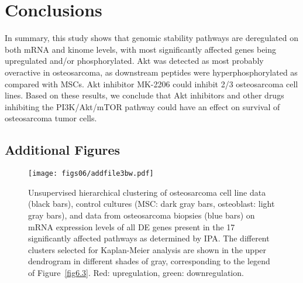 \section{Conclusions}\label{conclusions6}
In summary, this study shows that genomic stability pathways are deregulated on both mRNA and kinome levels, with most significantly affected genes being upregulated and/or phosphorylated. Akt was detected as most probably overactive in osteosarcoma, as downstream peptides were hyperphosphorylated as compared with MSCs. Akt inhibitor MK-2206 could inhibit 2/3 osteosarcoma cell lines. Based on these results, we conclude that Akt inhibitors and other drugs inhibiting the PI3K/Akt/mTOR pathway could have an effect on survival of osteosarcoma tumor cells.


\begin{small}
\begin{singlespace}

\end{singlespace}
\end{small}

\begin{subappendices}
	\newpage
	\setcounter{figure}{0}
	\section{Additional Figures}
		\renewcommand{\figurename}{Additional Figure}
		\begin{figure}[h]
		  \centering
		    \texttt{[image: figs06/addfile3bw.pdf]}	%
		    \caption{Unsupervised hierarchical clustering of osteosarcoma cell line data (black bars), control cultures (MSC: dark gray bars, osteoblast: light gray bars), and data from osteosarcoma biopsies (blue bars) on mRNA expression levels of all DE genes present in the 17 significantly affected pathways as determined by IPA. The different clusters selected for Kaplan\hyp{}Meier analysis are shown in the upper dendrogram in different shades of gray, corresponding to the legend of Figure~\ref{fig6.3}. Red: upregulation, green: downregulation.} %
		     \label{afig6.1}
		\end{figure}
\end{subappendices}

%